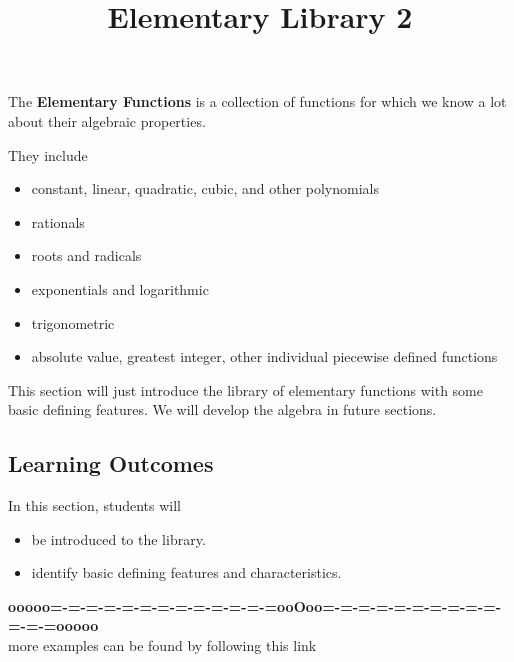 \documentclass{ximera}
\title{Elementary Library 2}
\begin{document}
\begin{abstract}
\end{abstract}
\maketitle




The \textbf{Elementary Functions} is a collection of functions for which we know a lot about their algebraic properties.

They include 

\begin{itemize}
\item constant, linear, quadratic, cubic, and other polynomials
\item rationals
\item roots and radicals
\item exponentials and logarithmic
\item trigonometric
\item absolute value, greatest integer, other individual piecewise defined functions
\end{itemize}



This section will just introduce the library of elementary functions with some basic defining features.  We will develop the algebra in future sections.












\subsection{Learning Outcomes}

\begin{sectionOutcomes}
In this section, students will 

\begin{itemize}
\item be introduced to the library.
\item identify basic defining features and characteristics.
\end{itemize}
\end{sectionOutcomes}







\begin{center}
\textbf{\textcolor{green!50!black}{ooooo=-=-=-=-=-=-=-=-=-=-=-=-=ooOoo=-=-=-=-=-=-=-=-=-=-=-=-=ooooo}} \\

more examples can be found by following this link\\ 

\end{center}
\end{document}
